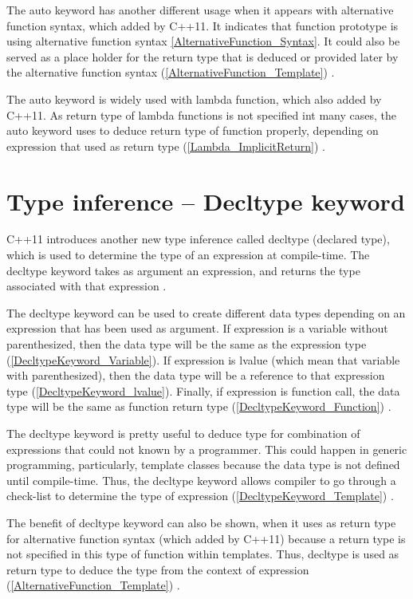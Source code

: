 \documentclass[11pt]{report}
\begin{document}
The auto keyword has another different usage when it appears with alternative function syntax, which added by C++11. It indicates that function prototype is using alternative function syntax \ref{AlternativeFunction_Syntax}. It could also be served as a place holder for the return type that is deduced or provided later by the alternative function syntax (\ref{AlternativeFunction_Template}) \cite{Prata:2012:Cpp}.


The auto keyword is widely used with lambda function, which also added by C++11. As return type of lambda functions is not specified int many cases, the auto keyword uses to deduce return type of function properly, depending on expression that used as return type (\ref{Lambda_ImplicitReturn}) \cite{Gregorie:professionalcpp}.

\section{Type inference – Decltype keyword}
\label{section: Decltype keyword}
C++11 introduces another new type inference called decltype (declared type), which is used to determine the type of an expression at compile-time. The decltype keyword takes as argument an expression, and returns the type associated with that expression \cite{Stroustrup:2012:Cpp11}. 


The decltype keyword can be used to create different data types depending on an expression that has been used as argument.  If expression is a variable without parenthesized, then the data type will be the same as the expression type (\ref{DecltypeKeyword_Variable}). If expression is lvalue (which mean that variable with parenthesized), then the data type will be a reference to that expression type (\ref{DecltypeKeyword_lvalue}). Finally, if expression is function call, the data type will be the same as function return type (\ref{DecltypeKeyword_Function}) \cite{Prata:2012:Cpp}.


The decltype keyword is pretty useful to deduce type for combination of expressions that could not known by a programmer. This could happen in generic programming, particularly, template classes because the data type is not defined until compile-time. Thus, the decltype keyword allows compiler to go through a check-list to determine the type of expression (\ref{DecltypeKeyword_Template}) \cite{Stroustrup:2012:Cpp11}.


The benefit of decltype keyword can also be shown, when it uses as return type for alternative function syntax (which added by C++11) because a return type is not specified in this type of function within templates. Thus, decltype is used as return type to deduce the type from the context of expression (\ref{AlternativeFunction_Template}) \cite{Gregorie:professionalcpp}. 
\end{document}
